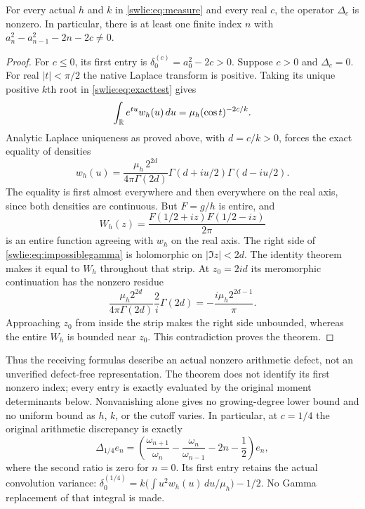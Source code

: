\documentclass[11pt]{article}
\begin{document}
\begin{swlietheorem}
\label{swlie:thm:nonzero}
For every actual $h$ and $k$ in \eqref{swlie:eq:measure} and every
real $c$, the operator $\Delta_c$ is nonzero. In particular,
there is at least one finite index $n$ with
$a_n^2-a_{n-1}^2-2n-2c\ne0$.
\end{swlietheorem}
\begin{proof}
For $c\leq0$, its first entry is
$\delta_0^{(c)}=a_0^2-2c>0$.
Suppose $c>0$ and $\Delta_c=0$.
For real $|t|<\pi/2$ the native Laplace transform is positive.
Taking its unique positive $k$th root in
\eqref{swlie:eq:exacttest} gives
\[
 \int_\mathbb R e^{tu}w_h(u)\,du
       =\mu_h(\cos t)^{-2c/k}.
\]
Analytic Laplace uniqueness as proved above, with
$d=c/k>0$, forces the exact equality of densities
\begin{equation}\label{swlie:eq:impossiblegamma}
 w_h(u)=\frac{\mu_h\,2^{2d}}{4\pi\Gamma(2d)}
                \Gamma(d+iu/2)\Gamma(d-iu/2).
\end{equation}
The equality is first almost everywhere and then everywhere
on the real axis, since both densities are continuous.
But $F=g/h$ is entire, and
\[
 W_h(z)=\frac{F(1/2+iz)F(1/2-iz)}{2\pi}
\]
is an entire function agreeing with $w_h$ on the real axis.
The right side of \eqref{swlie:eq:impossiblegamma} is holomorphic
on $|\Im z|<2d$. The identity theorem makes it equal to
$W_h$ throughout that strip. At $z_0=2id$ its meromorphic
continuation has the nonzero residue
\[
 \frac{\mu_h2^{2d}}{4\pi\Gamma(2d)}
       \frac{2}{i}\Gamma(2d)
       =-\frac{i\mu_h2^{2d-1}}{\pi}.
\]
Approaching $z_0$ from inside the strip makes the right
side unbounded, whereas the entire $W_h$ is bounded near
$z_0$. This contradiction proves the theorem.
\end{proof}

Thus the receiving formulas describe an actual nonzero
arithmetic defect, not an unverified defect-free
representation. The theorem does not identify its first
nonzero index; every entry is exactly evaluated by the
original moment determinants below. Nonvanishing alone
gives no growing-degree lower bound and no uniform bound
as $h$, $k$, or the cutoff varies.
In particular, at $c=1/4$ the original arithmetic discrepancy
is exactly
\begin{equation}\label{swlie:eq:archdefect}
 \boxed{\quad
 \Delta_{1/4}e_n=
       \left(\frac{\omega_{n+1}}{\omega_n}
        -\frac{\omega_n}{\omega_{n-1}}-2n-\frac12\right)e_n,
 \quad}
\end{equation}
where the second ratio is zero for $n=0$.
Its first entry retains the actual convolution variance:
$\delta_0^{(1/4)}
 =k\bigl(\int u^2w_h(u)\,du/\mu_h\bigr)-1/2$.
No Gamma replacement of that integral is made.
\end{document}

